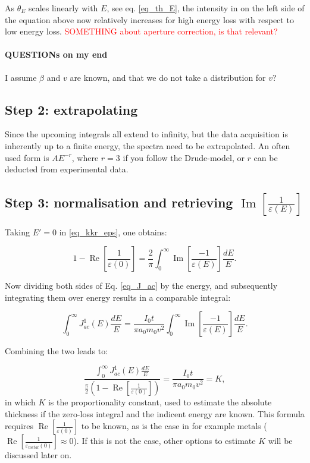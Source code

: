 \documentclass{article}
\begin{document}
As $\theta_E$ scales linearly with $E$, see eq. \eqref{eq_th_E}, the intensity in on the left side of the equation above now relatively increases for high energy loss with respect to low energy loss. \textcolor{red}{SOMETHING about aperture correction, is that relevant? }


\paragraph{QUESTIONs on my end} I assume $\beta$ and $v$ are known, and that we do not take a distribution for $v$? 


\subsection{Step 2: extrapolating}
Since the upcoming integrals all extend to infinity, but the data acquisition is inherently up to a finite energy, the spectra need to be extrapolated. An often used form is $AE^{-r}$, where $r=3$ if you follow the Drude-model, or $r$ can be deducted from experimental data.



\subsection{Step 3: normalisation and retrieving $\operatorname{Im}\left[\frac{1}{\varepsilon(E)}\right]$}

Taking $E' = 0$ in \eqref{eq_kkr_eps}, one obtains:

\begin{equation}
    1-\operatorname{Re}\left[\frac{1}{\varepsilon(0)}\right]=\frac{2}{\pi} \int_{0}^{\infty} \operatorname{Im}\left[\frac{-1}{\varepsilon(E)}\right] \frac{d E}{E}.
\end{equation}

Now dividing both sides of Eq. \eqref{eq_J_ac} by the energy, and subsequently integrating them over energy results in a comparable integral:

\begin{equation}\label{eq_J_ac}
    \int_{0}^{\infty} J^1_{ac}(E) \frac{d E}{E}=  \frac{I_{0} t}{\pi a_{0} m_{0} v^{2}}  \int_{0}^{\infty} \operatorname{Im}\left[\frac{-1}{\varepsilon(E)}\right]   \frac{d E}{E} .
\end{equation}

Combining the two leads to:

\begin{equation}
    \frac{\int_{0}^{\infty} J^1_{ac}(E) \frac{d E}{E}}{\frac{\pi}{2}(1-\operatorname{Re}\left[\frac{1}{\varepsilon(0)}\right])} = \frac{I_{0} t}{\pi a_{0} m_{0} v^{2}} = K ,
\end{equation}
in which $K$ is the proportionality constant, used to estimate the absolute thickness if the zero-loss integral and the indicent energy are known. This formula requires $\operatorname{Re}\left[\frac{1}{\varepsilon(0)}\right]$ to be known, as is the case in for example metals ($\operatorname{Re}\left[\frac{1}{\varepsilon_{metal}(0)}\right]\approx 0$). If this is not the case, other options to estimate $K$ will be discussed later on.
\end{document}
